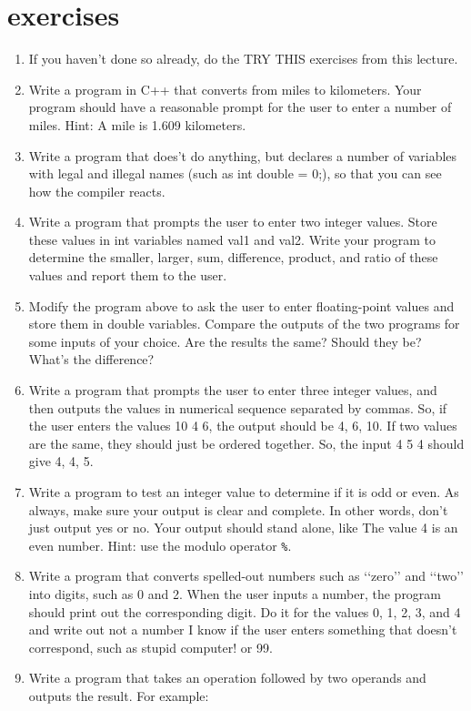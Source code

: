 \documentclass[11pt]{article}
\begin{document}
\section{exercises}
\label{sec:orgc2197a1}
\begin{enumerate}
\item If you haven’t done so already, do the TRY THIS exercises from this lecture.
\item Write a program in C++ that converts from miles to kilometers. Your program should have a reasonable prompt for the user to enter a number of miles. Hint: A mile is 1.609 kilometers.
\item Write a program that does’t do anything, but declares a number of variables with legal and illegal names (such as int double = 0;), so that you can see how the compiler reacts.
\item Write a program that prompts the user to enter two integer values. Store these values in int variables named val1 and val2. Write your program to determine the smaller, larger, sum, difference, product, and ratio of these values and report them to the user.
\item Modify the program above to ask the user to enter floating-point values and store them in double variables. Compare the outputs of the two programs for some inputs of your choice. Are the results the same? Should they be? What’s the difference?
\item Write a program that prompts the user to enter three integer values, and then outputs the values in numerical sequence separated by commas. So, if the user enters the values 10 4 6, the output should be 4, 6, 10. If two values are the same, they should just be ordered together. So, the input 4 5 4 should give 4, 4, 5.
\item Write a program to test an integer value to determine if it is odd or even. As always, make sure your output is clear and complete. In other words, don’t just output yes or no. Your output should stand alone, like The value 4 is an even number. Hint: use the modulo operator \texttt{\%}.
\item Write a program that converts spelled-out numbers such as ‘‘zero’’ and ‘‘two’’ into digits, such as 0 and 2. When the user inputs a number, the program should print out the corresponding digit. Do it for the values 0, 1, 2, 3, and 4 and write out not a number I know if the user enters something that doesn’t correspond, such as stupid computer! or 99.
\item Write a program that takes an operation followed by two operands and outputs the result. For example:

\end{enumerate}
\end{document}
